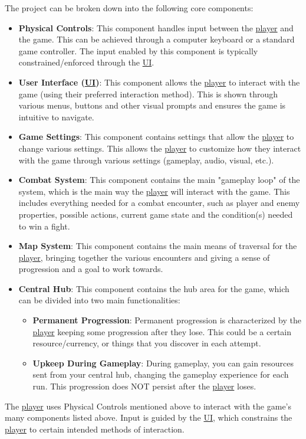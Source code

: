 The project can be broken down into the following core components:

\begin{itemize}
	\item \textbf{Physical Controls}: This component handles input between the \hyperlink{player}{player} and the game. This can be achieved through a computer keyboard or a standard game controller. The input enabled by this component is typically constrained/enforced through the \hyperlink{UI}{UI}.

	\item \textbf{User Interface (\hyperlink{UI}{UI})}: This component allows the \hyperlink{player}{player} to interact with the game (using their preferred interaction method). This is shown through various menus, buttons and other visual prompts and ensures the game is intuitive to navigate. 

	\item \textbf{Game Settings}: This component contains  settings that allow the \hyperlink{player}{player} to change various settings. This allows the \hyperlink{player}{player} to customize how they interact with the game through various settings (gameplay, audio, visual, etc.). 

	\item \textbf{Combat System}: This component contains the main "gameplay loop" of the system, which is the main way the \hyperlink{player}{player} will interact with the game. This includes everything needed for a combat encounter, such as player and enemy properties, possible actions, current game state and the condition(s) needed to win a fight.

	\item \textbf{Map System}: This component contains the main means of traversal for the \hyperlink{player}{player}, bringing together the various encounters and giving a sense of progression and a goal to work towards. 

	\item \textbf{Central Hub}: This component contains the hub area for the game, which can be divided into two main functionalities:
	\begin{itemize}
		\item \textbf{Permanent Progression}: Permanent progression is characterized by the \hyperlink{player}{player} keeping some progression after they lose. This could be a certain resource/currency, or things that you discover in each attempt.

		\item \textbf{Upkeep During Gameplay}: During gameplay, you can gain resources sent from your central hub, changing the gameplay experience for each run. This progression does NOT persist after the \hyperlink{player}{player} loses.
	\end{itemize}
\end{itemize}

The \hyperlink{player}{player} uses Physical Controls mentioned above to interact with the game's many components listed above. Input is guided by the \hyperlink{UI}{UI}, which constrains the \hyperlink{player}{player} to certain intended methods of interaction.
